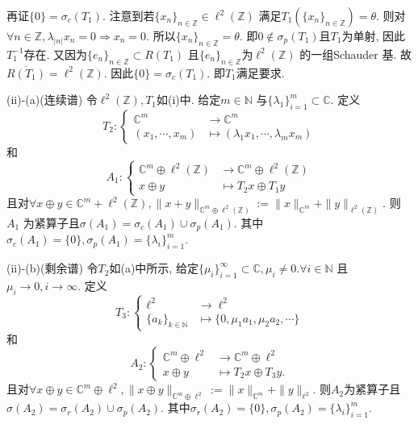 \documentclass[UTF8,twoside]{ctexbook}
\newcommand{\kx}{\mathbb}
\numberwithin{equation}{section}
\begin{document}
	再证$\{0\}=\sigma_c(T_1)$. 注意到若$\{x_n\}_{n\in\kx Z}\in\ell^2(\kx Z)$ 满足$T_1(\{x_n\}_{n\in\kx Z})=\theta$. 则对$\forall n\in\kx Z,\lambda_{|n|}x_n=0\Rightarrow x_n=0$. 所以$\{x_n\}_{n\in\kx Z}=\theta$. 即$0\notin\sigma_p(T_1)$且$T_1$为单射, 因此$T_1^{-1}$存在. 又因为$\{e_n\}_{n\in\kx Z}\subset R(T_1)$ 且$\{e_n\}_{n\in\kx Z}$为$\ell^2(\kx Z)$ 的一组Schauder 基. 故$\overline{R(T_1)}=\ell^2(\kx Z)$. 因此$\{0\}=\sigma_c(T_1)$. 即$T_1$满足要求.

	(ii)-(a)(连续谱) 令$\ell^2(\kx Z), T_1$如(i)中. 给定$m\in\kx N$ 与$\{\lambda_1\}_{i=1}^m\subset\kx C$. 定义
	\[
	T_2:\left\{
	\begin{aligned}
	\kx C^m&\rightarrow\kx C^m\\
	(x_1,\cdots,x_m)&\mapsto(\lambda_1 x_1,\cdots,\lambda_m x_m)
	\end{aligned}
	\right.
	\]
	和
	\[
	A_1:\left\{
	\begin{aligned}
	\kx C^m\oplus\ell^2(\kx Z)&\rightarrow \kx C^m\oplus\ell^2(\kx Z)\\
	x\oplus y&\mapsto T_2 x\oplus T_1y
	\end{aligned}
	\right.
	\]
	且对$\forall x\oplus y\in\kx C^m + \ell^2(\kx Z), \|x+y\|_{\kx C^m\oplus\ell^2(\kx Z)}:=\|x\|_{\kx C^m}+\|y\|_{\ell^2(\kx Z)}$. 则$A_1$ 为紧算子且$\sigma(A_1)=\sigma_c(A_1)\cup\sigma_p(A_1)$. 其中$\sigma_c(A_1)=\{0\}, \sigma_p(A_1)=\{\lambda_i\}_{i=1}^m$.

	(ii)-(b)(剩余谱) 令$T_2$如(a)中所示, 给定$\{\mu_i\}_{i=1}^{\infty}\subset\kx C, \mu_i\neq 0. \forall i\in\kx N$ 且$\mu_i\rightarrow 0, i\rightarrow \infty$. 定义
	\[
	T_3:\left\{
	\begin{aligned}
	\ell^2&\rightarrow\ell^2\\
	\{a_k\}_{k\in\kx N}&\mapsto\{0,\mu_1a_1,\mu_2a_2,\cdots\}
	\end{aligned}
	\right.
	\]
	和
	\[
	A_2:\left\{
	\begin{aligned}
	\kx C^m\oplus\ell^2&\rightarrow\kx C^m\oplus\ell^2\\
	x\oplus y&\mapsto T_2x\oplus T_3y.
	\end{aligned}
	\right.
	\]
	且对$\forall x\oplus y\in\kx C^m\oplus\ell^2,\|x\oplus y\|_{\kx C^m\oplus\ell^2}:=\|x\|_{\kx C^m}+\|y\|_{\ell^2}$. 则$A_2$为紧算子且$\sigma(A_2)=\sigma_r(A_2)\cup\sigma_p(A_2)$. 其中$\sigma_r(A_2)=\{0\}, \sigma_p(A_2)=\{\lambda_i\}_{i=1}^{m}$.
\end{document}
